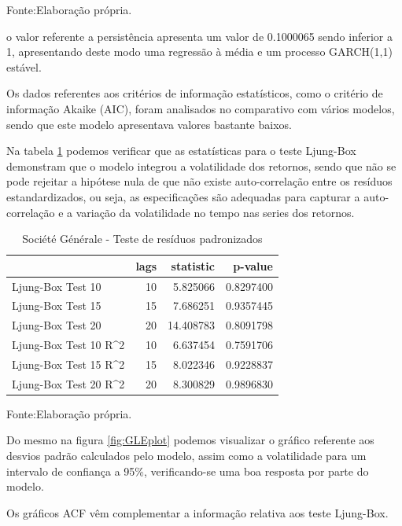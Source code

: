 \documentclass[
  12pt,
  a4paper,
  openany]{book}
\theoremstyle{definition}
\theoremstyle{definition}
\theoremstyle{definition}
\theoremstyle{remark}
\begin{document}
Fonte:Elaboração própria.

\justifying
\bigskip

o valor referente a persistência apresenta um valor de 0.1000065 sendo inferior a 1, apresentando deste modo uma regressão à média e um processo GARCH(1,1) estável.

Os dados referentes aos critérios de informação estatísticos, como o critério de informação Akaike (AIC), foram analisados no comparativo com vários modelos, sendo que este modelo apresentava valores bastante baixos.

Na tabela \ref{tab:GLELjunk} podemos verificar que as estatísticas para o teste Ljung-Box demonstram que o modelo integrou a volatilidade dos retornos, sendo que não se pode rejeitar a hipótese nula de que não existe auto-correlação entre os resíduos estandardizados, ou seja, as especificações são adequadas para capturar a auto-correlação e a variação da volatilidade no tempo nas series dos retornos.

\begin{table}[!h]

\caption{\label{tab:GLELjunk}Société Générale - Teste de resíduos padronizados }
\centering
\begin{tabular}[t]{lrrr}
\toprule
  & lags & statistic & p-value\\
\midrule
Ljung-Box Test 10 & 10 & 5.825066 & 0.8297400\\
Ljung-Box Test 15 & 15 & 7.686251 & 0.9357445\\
Ljung-Box Test 20 & 20 & 14.408783 & 0.8091798\\
Ljung-Box Test 10 R\textasciicircum{}2 & 10 & 6.637454 & 0.7591706\\
Ljung-Box Test 15 R\textasciicircum{}2 & 15 & 8.022346 & 0.9228837\\
\addlinespace
Ljung-Box Test 20 R\textasciicircum{}2 & 20 & 8.300829 & 0.9896830\\
\bottomrule
\end{tabular}
\end{table}
\FloatBarrier
\centering

Fonte:Elaboração própria.

\justifying
\bigskip

Do mesmo na figura \ref{fig:GLEplot} podemos visualizar o gráfico referente aos desvios padrão calculados pelo modelo, assim como a volatilidade para um intervalo de confiança a 95\%, verificando-se uma boa resposta por parte do modelo.

Os gráficos ACF vêm complementar a informação relativa aos teste Ljung-Box.
\end{document}
